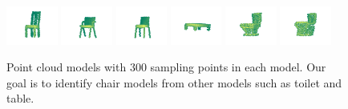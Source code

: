 

\begin{figure}[h]
\centering
\includegraphics[trim=130 0 80 0,clip,width=0.15\textwidth]{chair_large-eps-converted-to.pdf}
\includegraphics[trim=90 0 100 0,width=0.15\textwidth]{chair_large1-eps-converted-to.pdf}  
\includegraphics[trim=60 0 100 0,width=0.15\textwidth]{chair_large2-eps-converted-to.pdf} 
\includegraphics[trim=60 0 50 0,width=0.15\textwidth]{table_large-eps-converted-to.pdf}  
\includegraphics[trim=60 0 100 0,width=0.15\textwidth]{toilet_large-eps-converted-to.pdf}  
\includegraphics[trim=60 0 100 0,width=0.15\textwidth]{toilet_large1-eps-converted-to.pdf} 

\caption{Point cloud models with 300 sampling points in each model. Our goal is to identify chair models from other models such as toilet and table. }
\label{fig:points}
\end{figure}

